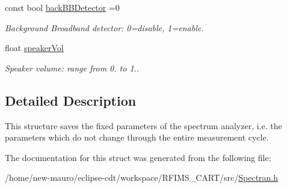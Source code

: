 \begin{DoxyCompactItemize}
\mbox{\label{structSpectranConfigurator_1_1FixedParameters_ad20c44e63927366260399b4ffa5a32d9}} 
const bool \hyperlink{structSpectranConfigurator_1_1FixedParameters_ad20c44e63927366260399b4ffa5a32d9}{back\+B\+B\+Detector} =0
\begin{DoxyCompactList}\small\item\em Background Broadband detector\+: 0=disable, 1=enable. \end{DoxyCompactList}\item 
\mbox{\label{structSpectranConfigurator_1_1FixedParameters_a4b30a0ba5199d6c6703838142da3bcdc}} 
float \hyperlink{structSpectranConfigurator_1_1FixedParameters_a4b30a0ba5199d6c6703838142da3bcdc}{speaker\+Vol}
\begin{DoxyCompactList}\small\item\em Speaker volume\+: range from 0. to 1.. \end{DoxyCompactList}\end{DoxyCompactItemize}


\subsection{Detailed Description}
This structure saves the fixed parameters of the spectrum analyzer, i.\+e. the parameters which do not change through the entire measurement cycle. 

The documentation for this struct was generated from the following file\+:\begin{DoxyCompactItemize}
\item 
/home/new-\/mauro/eclipse-\/cdt/workspace/\+R\+F\+I\+M\+S\+\_\+\+C\+A\+R\+T/src/\hyperlink{Spectran_8h}{Spectran.\+h}\end{DoxyCompactItemize}
